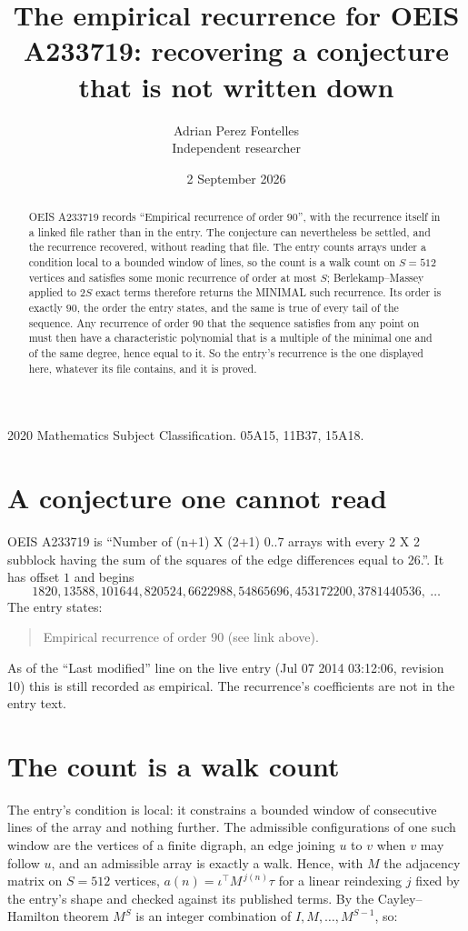 \documentclass[11pt,a4paper]{article}
\title{The empirical recurrence for OEIS A233719: recovering a conjecture that is not written down}
\author{Adrian Perez Fontelles\\ \small Independent researcher}
\date{2 September 2026}
\theoremstyle{plain}
\theoremstyle{definition}
\begin{document}
\maketitle

\begin{abstract}
OEIS A233719 records ``Empirical recurrence of order $90$'', with the recurrence itself in a
linked file rather than in the entry. The conjecture can nevertheless be settled, and the
recurrence recovered, without reading that file. The entry counts arrays under a condition
local to a bounded window of lines, so the count is a walk count on $S=512$ vertices and
satisfies some monic recurrence of order at most $S$; Berlekamp--Massey applied to $2S$ exact
terms therefore returns the MINIMAL such recurrence. Its order is exactly $90$, the order
the entry states, and the same is true of every tail of the sequence. Any recurrence of order
$90$ that the sequence satisfies from any point on must then have a characteristic
polynomial that is a multiple of the minimal one and of the same degree, hence equal to it. So
the entry's recurrence is the one displayed here, whatever its file contains, and it is
proved.
\end{abstract}

\noindent\small 2020 Mathematics Subject Classification. 05A15, 11B37, 15A18.\normalsize

\section{A conjecture one cannot read}

OEIS A233719 is ``Number of (n+1) X (2+1) 0..7 arrays with every 2 X 2 subblock having the sum of the squares of the edge differences equal to 26.''. It has offset $1$ and begins
\[
1820, 13588, 101644, 820524, 6622988, 54865696, 453172200, 3781440536,\ \dots
\]
The entry states:
\begin{quote}
Empirical recurrence of order 90 (see link above).
\end{quote}
As of the ``Last modified'' line on the live entry (Jul 07 2014 03:12:06, revision 10) this is still
recorded as empirical. The recurrence's coefficients are not in the entry text.

\section{The count is a walk count}

The entry's condition is local: it constrains a bounded window of consecutive lines of the
array and nothing further. The admissible configurations of one such window are the vertices
of a finite digraph, an edge joining $u$ to $v$ when $v$ may follow $u$, and an admissible
array is exactly a walk. Hence, with $M$ the adjacency matrix on $S=512$ vertices,
$a(n)=\iota^{\!\top}M^{\,j(n)}\tau$ for a linear reindexing $j$ fixed by the entry's shape
and checked against its published terms. By the Cayley--Hamilton theorem $M^{S}$ is an
integer combination of $I,M,\dots,M^{S-1}$, so:
\end{document}
